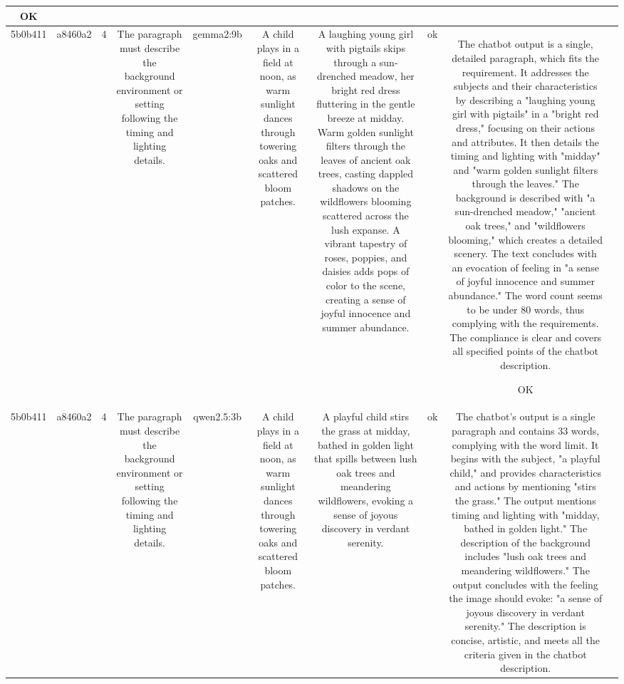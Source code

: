 \begin{table}[h!]
\begin{tabular}{|c|c|c|c|c|c|c|c|c|c|}
OK & \\
\hline
5b0b411 & a8460a2 & 4 & The paragraph must describe the background environment or setting following the timing and lighting details. & gemma2:9b & A child plays in a field at noon, as warm sunlight dances through towering oaks and scattered bloom patches. & A laughing young girl with pigtails skips through a sun-drenched meadow, her bright red dress fluttering in the gentle breeze at midday. Warm golden sunlight filters through the leaves of ancient oak trees, casting dappled shadows on the wildflowers blooming scattered across the lush expanse.  A vibrant tapestry of roses, poppies, and daisies adds pops of color to the scene, creating a sense of joyful innocence and summer abundance. 


 & ok & The chatbot output is a single, detailed paragraph, which fits the requirement. It addresses the subjects and their characteristics by describing a "laughing young girl with pigtails" in a "bright red dress," focusing on their actions and attributes. It then details the timing and lighting with "midday" and "warm golden sunlight filters through the leaves." The background is described with "a sun-drenched meadow," "ancient oak trees," and "wildflowers blooming," which creates a detailed scenery. The text concludes with an evocation of feeling in "a sense of joyful innocence and summer abundance." The word count seems to be under 80 words, thus complying with the requirements. The compliance is clear and covers all specified points of the chatbot description.

OK & \\
\hline
5b0b411 & a8460a2 & 4 & The paragraph must describe the background environment or setting following the timing and lighting details. & qwen2.5:3b & A child plays in a field at noon, as warm sunlight dances through towering oaks and scattered bloom patches. & A playful child stirs the grass at midday, bathed in golden light that spills between lush oak trees and meandering wildflowers, evoking a sense of joyous discovery in verdant serenity. & ok & The chatbot's output is a single paragraph and contains 33 words, complying with the word limit. It begins with the subject, "a playful child," and provides characteristics and actions by mentioning "stirs the grass." The output mentions timing and lighting with "midday, bathed in golden light." The description of the background includes "lush oak trees and meandering wildflowers." The output concludes with the feeling the image should evoke: "a sense of joyous discovery in verdant serenity." The description is concise, artistic, and meets all the criteria given in the chatbot description.


\end{tabular}
\end{table}
